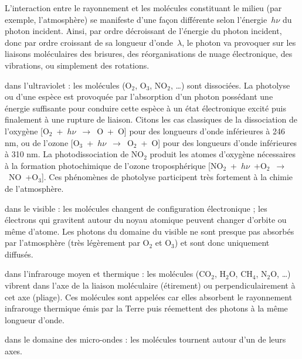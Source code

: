 \sk
L'interaction entre le rayonnement et les molécules constituant le milieu (par exemple, l'atmosphère) se manifeste d'une façon différente selon l'énergie~$h\nu$ du photon incident. Ainsi, par ordre décroissant de l'énergie du photon incident, donc par ordre croissant de sa longueur d'onde~$\lambda$, le photon va provoquer sur les liaisons moléculaires des brisures, des réorganisations de nuage électronique, des vibrations, ou simplement des rotations.
\begin{finger}
\item dans l'ultraviolet : les molécules (O$_2$, O$_3$, NO$_2$, \ldots) sont dissociées. La photolyse ou  d'une espèce est provoquée par l'absorption d'un photon possédant une énergie suffisante pour conduire cette espèce à un état électronique excité puis finalement à une rupture de liaison. Citons les cas classiques de la dissociation de l'oxygène [O$_2$~+~$h\nu$~$\rightarrow$~O~+~O] pour des longueurs d'onde inférieures à 246 nm, ou de l'ozone [O$_3$~+~$h\nu$~$\rightarrow$~O$_2$~+~O] pour des longueurs d'onde inférieures à 310 nm. La photodissociation de NO$_2$ produit les atomes d’oxygène nécessaires à la formation photochimique de l’ozone troposphérique [NO$_2$~+~$h\nu$~+O$_2$~$\rightarrow$~NO~+O$_3$]. Ces phénomènes de photolyse participent très fortement à la chimie de l'atmosphère.
\item dans le visible : les molécules changent de configuration électronique ; les électrons qui gravitent autour du noyau atomique peuvent changer d'orbite ou même d'atome. Les photons du domaine du visible ne sont presque pas absorbés par l'atmosphère (très légèrement par O$_2$ et O$_3$) et sont donc uniquement diffusés.
\item dans l'infrarouge moyen et thermique : les molécules (CO$_2$, H$_2$O, CH$_4$, N$_2$O, \ldots) vibrent dans l'axe de la liaison moléculaire (étirement) ou perpendiculairement à cet axe (pliage). Ces molécules sont appelées  car elles absorbent le rayonnement infrarouge thermique émis par la Terre puis réemettent des photons à la même longueur d'onde.
\item dans le domaine des micro-ondes : les molécules tournent autour d'un de leurs axes.
\end{finger}
